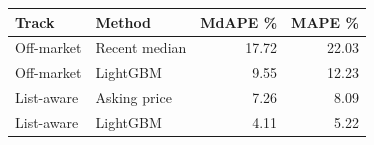 \begin{tabular}{llrr}
\toprule
Track & Method & MdAPE \% & MAPE \% \\
\midrule
Off-market & Recent median & 17.72 & 22.03 \\
Off-market & LightGBM & 9.55 & 12.23 \\
List-aware & Asking price & 7.26 & 8.09 \\
List-aware & LightGBM & 4.11 & 5.22 \\
\bottomrule
\end{tabular}

